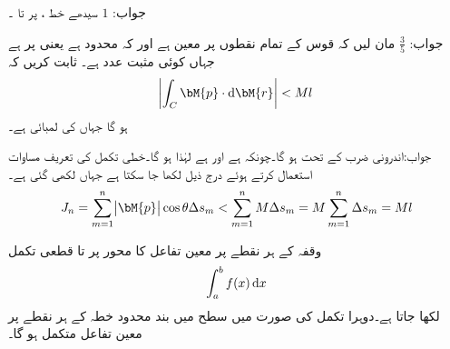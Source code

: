 جواب:
$1$
سیدھے خط ،  پر  تا ۔

جواب:
$\tfrac{3}{5}$
مان لیں کہ قوس  کے تمام نقطوں  پر  معین ہے اور کہ  محدود ہے یعنی  پر  ہے جہاں  کوئی مثبت عدد ہے۔ ثابت کریں کہ 
\begin{align}
\abs{\int_C \bM{p}\cdot \dif \bM{r}} < Ml
\end{align}
ہو گا جہاں  کی لمبائی  ہے۔

جواب:اندرونی ضرب کے تحت  ہو گا۔چونکہ  ہے اور  ہے لہٰذا  ہو گا۔خطی تکمل کی تعریف مساوات  استعمال کرتے ہوئے  درج ذیل لکھا جا سکتا ہے جہاں  لکھی گئی ہے۔
\begin{align*}
J_n=\sum_{m=1}^{n} \abs{\bM{p}}\cos \theta \Delta s_m < \sum_{m=1}^{n} M \Delta s_m =M\sum_{m=1}^{n}  \Delta s_m =Ml
\end{align*}

وقفہ  کے ہر نقطے پر معین تفاعل  کا  محور پر  تا  قطعی تکمل 
\begin{align*}
\int_a^b f(x)\dif x
\end{align*}
لکھا جاتا ہے۔دوہرا تکمل کی صورت میں  سطح میں بند محدود خطہ  کے ہر نقطے پر معین تفاعل  متکمل ہو گا۔

